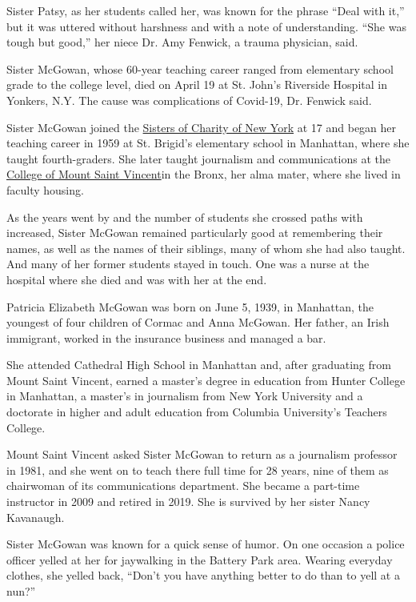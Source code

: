 Sister Patsy, as her students called her, was known for the phrase
``Deal with it,'' but it was uttered without harshness and with a note
of understanding. ``She was tough but good,'' her niece Dr. Amy Fenwick,
a trauma physician, said.

Sister McGowan, whose 60-year teaching career ranged from elementary
school grade to the college level, died on April 19 at St. John's
Riverside Hospital in Yonkers, N.Y. The cause was complications of
Covid-19, Dr. Fenwick said.

Sister McGowan joined the
\href{https://www.scny.org/in-memoriam-sister-patricia-mcgowan-sc/}{Sisters
of Charity of New York} at 17 and began her teaching career in 1959 at
St. Brigid's elementary school in Manhattan, where she taught
fourth-graders. She later taught journalism and communications at the
\href{https://mountsaintvincent.edu/}{College of Mount Saint Vincent}in
the Bronx, her alma mater, where she lived in faculty housing.

As the years went by and the number of students she crossed paths with
increased, Sister McGowan remained particularly good at remembering
their names, as well as the names of their siblings, many of whom she
had also taught. And many of her former students stayed in touch. One
was a nurse at the hospital where she died and was with her at the end.

Patricia Elizabeth McGowan was born on June 5, 1939, in Manhattan, the
youngest of four children of Cormac and Anna McGowan. Her father, an
Irish immigrant, worked in the insurance business and managed a bar.

She attended Cathedral High School in Manhattan and, after graduating
from Mount Saint Vincent, earned a master's degree in education from
Hunter College in Manhattan, a master's in journalism from New York
University and a doctorate in higher and adult education from Columbia
University's Teachers College.

Mount Saint Vincent asked Sister McGowan to return as a journalism
professor in 1981, and she went on to teach there full time for 28
years, nine of them as chairwoman of its communications department. She
became a part-time instructor in 2009 and retired in 2019. She is
survived by her sister Nancy Kavanaugh.

Sister McGowan was known for a quick sense of humor. On one occasion a
police officer yelled at her for jaywalking in the Battery Park area.
Wearing everyday clothes, she yelled back, ``Don't you have anything
better to do than to yell at a nun?''

